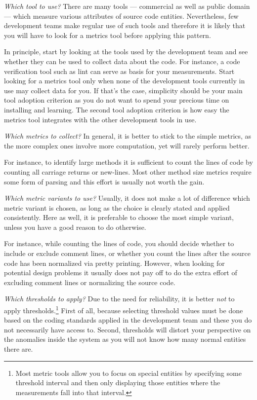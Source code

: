 \documentclass[a4paper,10pt,twoside]{book}
\begin{document}
\begin{bulletlist}
\item \emph{Which tool to use?}
There are many tools --- commercial as well as public domain --- which measure various 
attributes of source code entities. Nevertheless, few development teams make regular use of 
such tools and therefore it is likely that you will have to look for a metrics tool before 
applying this pattern.

In principle, start by looking at the tools used by the development team and see whether 
they can be used to collect data about the code. For instance, a code verification tool 
such as lint can serve as basis for your measurements. Start looking for a metrics tool 
only when none of the development tools currently in use may collect data for you. If 
that's the case, simplicity should be your main tool adoption criterion as you do not want 
to spend your precious time on installing and learning. The second tool adoption criterion 
is how easy the metrics tool integrates with the other development tools in use.

\item \emph{Which metrics to collect?}
In general, it is better to stick to the simple metrics, as the more complex ones involve 
more computation, yet will rarely perform better.

For instance, to identify large methods it is sufficient to count the lines of code by 
counting all carriage returns or new-lines. Most other method size metrics require some 
form of parsing and this effort is usually not worth the gain.

\item \emph{Which metric variants to use?}
Usually, it does not make a lot of difference which metric variant is chosen, as long as 
the choice is clearly stated and applied consistently. Here as well, it is preferable to 
choose the most simple variant, unless you have a good reason to do otherwise.

For instance, while counting the lines of code, you should decide whether to include or 
exclude comment lines, or whether you count the lines after the source code has been 
normalized via pretty printing. However, when looking for potential design problems it 
usually does not pay off to do the extra effort of excluding comment lines or normalizing 
the source code.

\item \emph{Which thresholds to apply?}
Due to the need for reliability, it is better \emph{not} to apply thresholds.\footnote{Most 
metric tools allow you to focus on special entities by specifying some threshold interval 
and then only displaying those entities where the measurements fall into that interval.} 
First of all, because selecting threshold values must be done based on the coding standards 
applied in the development team and these you do not necessarily have access to. Second, 
thresholds will distort your perspective on the anomalies inside the system as you will not 
know how many normal entities there are.


\end{bulletlist}
\end{document}
